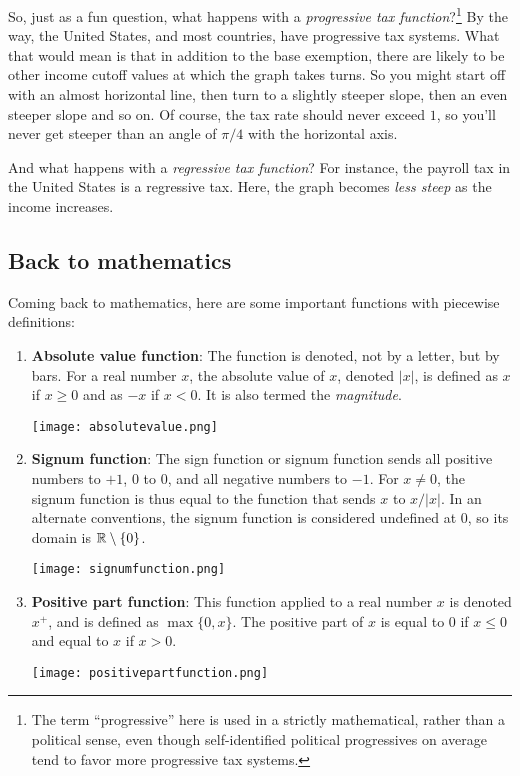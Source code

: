 \documentclass{amsart}
\begin{document}
So, just as a fun question, what happens with a {\em progressive tax
function}?\footnote{The term ``progressive'' here is used in a strictly
mathematical, rather than a political sense, even though
self-identified political progressives on average tend to favor more
progressive tax systems.} By the way, the United States, and most
countries, have progressive tax systems. What that would mean is that
in addition to the base exemption, there are likely to be other income
cutoff values at which the graph takes turns. So you might start off
with an almost horizontal line, then turn to a slightly steeper slope,
then an even steeper slope and so on. Of course, the tax rate should
never exceed $1$, so you'll never get steeper than an angle of $\pi/4$
with the horizontal axis.

And what happens with a {\em regressive tax function}? For instance,
the payroll tax in the United States is a regressive tax. Here, the
graph becomes {\em less steep} as the income increases.

\subsection{Back to mathematics}
Coming back to mathematics, here are some important functions with
piecewise definitions:

\begin{enumerate}
\item {\bf Absolute value function}: The function is denoted, not by a
  letter, but by bars. For a real number $x$, the absolute value of
  $x$, denoted $|x|$, is defined as $x$ if $x \ge 0$ and as $-x$ if $x
  < 0$. It is also termed the {\em magnitude}.

  \texttt{[image: absolutevalue.png]}

\item {\bf Signum function}: The sign function or signum function
  sends all positive numbers to $+1$, $0$ to $0$, and all negative
  numbers to $-1$. For $x \ne 0$, the signum function is thus equal to
  the function that sends $x$ to $x/|x|$. In an alternate conventions,
  the signum function is considered undefined at $0$, so its domain is
  $\mathbb{R} \setminus \{ 0 \}$.

  \texttt{[image: signumfunction.png]}

\item {\bf Positive part function}: This function applied to a real
  number $x$ is denoted $x^+$, and is defined as $\max \{ 0, x
  \}$. The positive part of $x$ is equal to $0$ if $x \le 0$ and equal
  to $x$ if $x > 0$.

  \texttt{[image: positivepartfunction.png]}

\end{enumerate}
\end{document}
